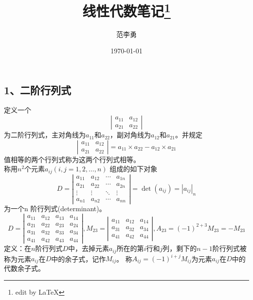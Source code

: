 \documentclass[12pt]{book}%
\title{\heiti 线性代数笔记\footnote{edit by \LaTeX}}
\author{\kaishu 范李勇}
\date{\today}
\begin{document}
\maketitle
\subsection*{ 1、二阶行列式}
定义一个
$$
\left|\begin{array}{cc} a_{11} & a_{12} \\
a_{21} & a_{22} \end{array}\right|
$$
为二阶行列式，主对角线为$a_{11}$和$a_{22}$，副对角线为$a_{12}$和$a_{21}$。并规定
$$
\left|\begin{array}{cc} a_{11} & a_{12} \\
a_{21} & a_{22} \end{array}\right|=a_{11}\times a_{22}-a_{12}\times a_{21}
$$
值相等的两个行列式称为这两个行列式相等。\\
称用$n^2$个元素$a_{ij}  (i,j =1,2,…,n)$ 组成的如下对象
$$
D=\left|
\begin{array}{cccc} 
    a_{11} & a_{12} & \cdots & a_{1n} \\ 
    a_{21} & a_{22} & \cdots & a_{2n} \\ 
    \vdots & \vdots & \ddots & \vdots \\
    a_{n1} & a_{n2} & \cdots & a_{nn} 
\end{array}
\right|=\det(a_{ij})=|a_{ij}|_{n}
$$
为一个n 阶行列式(determinant)。
$$
D=\left|
\begin{array}{cccc} 
    a_{11} & a_{12} & a_{13} & a_{14} \\
    a_{21} & a_{22} & a_{23} & a_{24} \\
    a_{31} & a_{32} & a_{33} & a_{34} \\
    a_{41} & a_{42} & a_{43} & a_{44} 
\end{array}\right|,
M_{23}=\left|
\begin{array}{ccc} 
    a_{11} & a_{12} & a_{14} \\
    a_{31} & a_{32} & a_{34} \\
    a_{41} & a_{42} & a_{44} 
\end{array}\right|,A_{23}=(-1)^{2+3}M_{23}=-M_{23}
$$
定义：在$n$阶行列式$D$中，去掉元素$a_{ij}$所在的第$i$行和$j$列，剩下的$n-1$阶行列式被称为元素$a_{ij}$在$D$中的余子式，记作$M_{ij}$。
称$A_{ij}=(-1)^{i+j}M_{ij}$为元素$a_{ij}$在$D$中的代数余子式。
\end{document}
